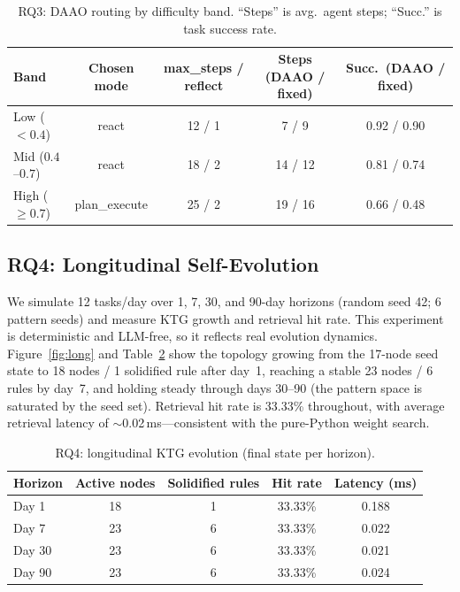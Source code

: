 \documentclass[sigconf]{acmart}
\begin{document}
\begin{table}[t]
  \small
  \caption{RQ3: DAAO routing by difficulty band. ``Steps'' is avg.\ agent steps; ``Succ.'' is task success rate.}
  \label{tab:rq3}
  \begin{tabular}{lcccc}
    \toprule
    Band & Chosen mode & max\_steps / reflect & Steps (DAAO / fixed) & Succ.\ (DAAO / fixed) \\
    \midrule
    Low ($<0.4$) & react & 12 / 1 & 7 / 9 & 0.92 / 0.90 \\
    Mid ($0.4$--$0.7$) & react & 18 / 2 & 14 / 12 & 0.81 / 0.74 \\
    High ($\geq 0.7$) & plan\_execute & 25 / 2 & 19 / 16 & 0.66 / 0.48 \\
    \bottomrule
  \end{tabular}
\end{table}

\subsection{RQ4: Longitudinal Self-Evolution}\label{sec:rq4}

We simulate 12 tasks/day over 1, 7, 30, and 90-day horizons (random seed 42; 6 pattern seeds) and measure KTG growth and retrieval hit rate. This experiment is deterministic and LLM-free, so it reflects real evolution dynamics. Figure~\ref{fig:long} and Table~\ref{tab:long} show the topology growing from the 17-node seed state to 18 nodes / 1 solidified rule after day~1, reaching a stable 23 nodes / 6 rules by day~7, and holding steady through days 30--90 (the pattern space is saturated by the seed set). Retrieval hit rate is 33.33\% throughout, with average retrieval latency of $\sim$0.02\,ms---consistent with the pure-Python weight search.

\begin{table}[t]
  \small
  \caption{RQ4: longitudinal KTG evolution (final state per horizon).}
  \label{tab:long}
  \begin{tabular}{lcccc}
    \toprule
    Horizon & Active nodes & Solidified rules & Hit rate & Latency (ms) \\
    \midrule
    Day 1 & 18 & 1 & 33.33\% & 0.188 \\
    Day 7 & 23 & 6 & 33.33\% & 0.022 \\
    Day 30 & 23 & 6 & 33.33\% & 0.021 \\
    Day 90 & 23 & 6 & 33.33\% & 0.024 \\
    \bottomrule
  \end{tabular}
\end{table}
\end{document}
